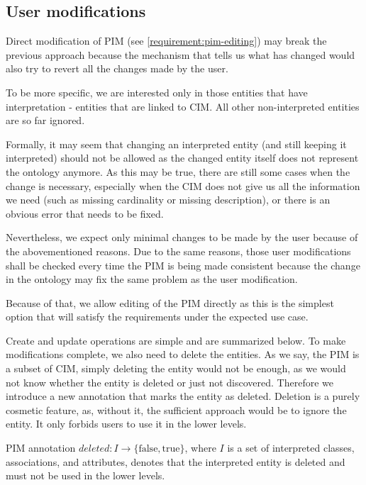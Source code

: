 \subsection{User modifications}

Direct modification of PIM (see \autoref{requirement:pim-editing}) may break the previous approach because the mechanism that tells us what has changed would also try to revert all the changes made by the user.

To be more specific, we are interested only in those entities that have interpretation - entities that are linked to CIM. All other non-interpreted entities are so far ignored.

Formally, it may seem that changing an interpreted entity (and still keeping it interpreted) should not be allowed as the changed entity itself does not represent the ontology anymore. As this may be true, there are still some cases when the change is necessary, especially when the CIM does not give us all the information we need (such as missing cardinality or missing description), or there is an obvious error that needs to be fixed.

\medskip

Nevertheless, we expect only minimal changes to be made by the user because of the abovementioned reasons. Due to the same reasons, those user modifications shall be checked every time the PIM is being made consistent because the change in the ontology may fix the same problem as the user modification.

Because of that, we allow editing of the PIM directly as this is the simplest option that will satisfy the requirements under the expected use case.

Create and update operations are simple and are summarized below. To make modifications complete, we also need to delete the entities. As we say, the PIM is a subset of CIM, simply deleting the entity would not be enough, as we would not know whether the entity is deleted or just not discovered. Therefore we introduce a new annotation that marks the entity as deleted. Deletion is a purely cosmetic feature, as, without it, the sufficient approach would be to ignore the entity. It only forbids users to use it in the lower levels.

\begin{definition}[deleted]
    PIM annotation $deleted: I \rightarrow \{\textrm{false}, \textrm{true}\}$, where $I$ is a set of interpreted classes, associations, and attributes, denotes that the interpreted entity is deleted and must not be used in the lower levels.
\end{definition}


